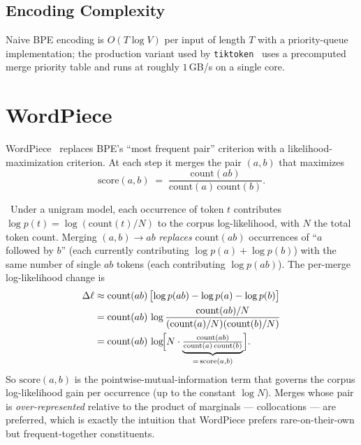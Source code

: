 \subsection{Encoding Complexity}

Naive BPE encoding is $O(T \log V)$ per input of length $T$ with a
priority-queue implementation; the production variant used by
\texttt{tiktoken}~\citep{openai_tiktoken} uses a precomputed merge
priority table and runs at roughly $1$\,GB/s on a single core.

\section{WordPiece}

WordPiece~\citep{devlin2019bert} replaces BPE's ``most frequent pair''
criterion with a likelihood-maximization criterion. At each step it
merges the pair $(a, b)$ that maximizes
\begin{equation}
\label{eq:ch4-wordpiece}
\mathrm{score}(a, b) \;=\;
\frac{\mathrm{count}(ab)}
     {\mathrm{count}(a)\,\mathrm{count}(b)}.
\end{equation}

\begin{derivation}
\Assum\ Under a unigram model, each occurrence of token $t$
contributes $\log p(t) = \log(\mathrm{count}(t)/N)$ to the corpus
log-likelihood, with $N$ the total token count. Merging
$(a,b) \to ab$ \emph{replaces} $\mathrm{count}(ab)$ occurrences of
``$a$ followed by $b$'' (each currently contributing
$\log p(a) + \log p(b)$) with the same number of single $ab$ tokens
(each contributing $\log p(ab)$). The per-merge log-likelihood
change is
\begin{align*}
\Delta \ell &\approx \mathrm{count}(ab)\,\bigl[\log p(ab)
  - \log p(a) - \log p(b)\bigr]\\
&= \mathrm{count}(ab)\,\log
  \frac{\mathrm{count}(ab)/N}
       {(\mathrm{count}(a)/N)(\mathrm{count}(b)/N)}\\
&= \mathrm{count}(ab)\,\log\!\Bigl[N \cdot
  \underbrace{\tfrac{\mathrm{count}(ab)}
    {\mathrm{count}(a)\,\mathrm{count}(b)}}_{=\,\mathrm{score}(a,b)}\Bigr].
\end{align*}
So $\mathrm{score}(a,b)$ is the pointwise-mutual-information term
that governs the corpus log-likelihood gain per occurrence (up to
the constant $\log N$). Merges whose pair is \emph{over-represented}
relative to the product of marginals --- collocations --- are
preferred, which is exactly the intuition that WordPiece prefers
rare-on-their-own but frequent-together constituents.
\end{derivation}

